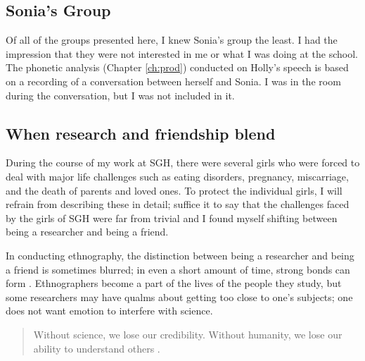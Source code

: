 \subsection{Sonia's Group}
Of all of the groups presented here, I knew Sonia's group the least.  I had the impression that they were not interested in me or what I was doing at the school.  The phonetic analysis (Chapter \ref{ch:prod}) conducted on Holly's speech is based on a recording of a conversation between herself and Sonia.  I was in the room during the conversation, but I was not included in it.  




\subsection{When research and friendship blend}

During the course of my work at SGH, there were several girls who were forced to deal with major life challenges such as eating disorders, pregnancy, miscarriage, and the death of parents and loved ones.  To protect the individual girls, I will refrain from describing these in detail; suffice it to say that the challenges faced by the girls of SGH were far from trivial and I found myself shifting between being a researcher and being a friend.

In conducting ethnography, the distinction between being a researcher and being a friend is sometimes blurred; in even a short amount of time, strong bonds can form \cite[79]{milroy1987}.  Ethnographers become a part of the lives of the people they study, but some researchers may have qualms about getting too close to one's subjects; one does not want emotion to interfere with science.    
\begin{quote}
	Without science, we lose our credibility.  Without humanity, we lose our ability to understand others \cite[13]{agar1980}.
\end{quote}

